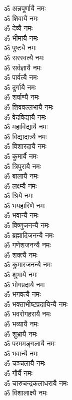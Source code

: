 \begin{multicols}{2}
\begin{flushleft}
ॐ अन्नपूर्णायै नमः\\
ॐ शिवायै नमः\\
ॐ देव्यै नमः\\
ॐ भीमायै नमः\\
ॐ पुष्ट्यै नमः\\
ॐ सरस्वत्यै नमः\\
ॐ सर्वज्ञायै नमः\\
ॐ पार्वत्यै नमः\\
ॐ दुर्गायै नमः\\
ॐ शर्वाण्यै नमः\hfill{}\\
ॐ शिववल्लभायै नमः\\
ॐ वेदविद्यायै नमः\\
ॐ महाविद्यायै नमः\\
ॐ विद्यादात्र्यै नमः\\
ॐ विशारदायै नमः\\
ॐ कुमार्यै नमः\\
ॐ त्रिपुरायै नमः\\
ॐ बालायै नमः\\
ॐ लक्ष्म्यै नमः\\
ॐ श्रियै नमः\hfill{}\\
ॐ भयहारिणै नमः\\
ॐ भवान्यै नमः\\
ॐ विष्णुजनन्यै नमः\\
ॐ ब्रह्मादिजनन्यै नमः\\
ॐ गणेशजनन्यै नमः\\
ॐ शक्त्यै नमः\\
ॐ कुमारजनन्यै नमः\\
ॐ शुभायै नमः\\
ॐ भोगप्रदायै नमः\\
ॐ भगवत्यै नमः\hfill{}\\
ॐ भक्ताभीष्टप्रदायिन्यै नमः\\
ॐ भवरोगहरायै नमः\\
ॐ भव्यायै नमः\\
ॐ शुभ्रायै नमः\\
ॐ परममङ्गलायै नमः\\
ॐ भवान्यै नमः\\
ॐ चञ्चलायै नमः\\
ॐ गौर्यै नमः\\
ॐ चारुचन्द्रकलाधरायै नमः\\
ॐ विशालाक्ष्यै नमः\hfill{}\\

\end{flushleft}
\end{multicols}
